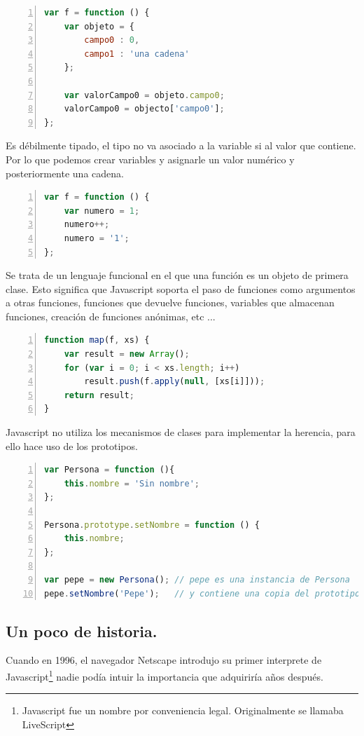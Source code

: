 \begin{lstlisting}[language=JavaScript, numbers=left]
var f = function () {
	var objeto = { 
		campo0 : 0,
		campo1 : 'una cadena' 
	};
	
	var valorCampo0 = objeto.campo0;
	valorCampo0 = objecto['campo0'];
};
\end{lstlisting}

Es débilmente tipado, el tipo no va asociado a la variable si al valor que contiene. Por lo que podemos crear variables y asignarle un valor numérico y posteriormente una cadena. 

\begin{lstlisting}[language=JavaScript, numbers=left]
var f = function () {
	var numero = 1;
	numero++;
	numero = '1';
};
\end{lstlisting}

Se trata de un lenguaje funcional en el que una función es un objeto de primera clase. Esto significa que Javascript soporta el paso de funciones como argumentos a otras funciones, funciones que devuelve funciones, variables que almacenan funciones, creación de funciones anónimas, etc ...

\begin{lstlisting}[language=JavaScript, numbers=left]
function map(f, xs) {
	var result = new Array();
	for (var i = 0; i < xs.length; i++)
		result.push(f.apply(null, [xs[i]]));
	return result;
}
\end{lstlisting}

Javascript no utiliza los mecanismos de clases para implementar la herencia, para ello hace uso de los prototipos. 

\begin{lstlisting}[language=JavaScript, numbers=left]
var Persona = function (){
	this.nombre = 'Sin nombre';
};

Persona.prototype.setNombre = function () {
	this.nombre;
};

var pepe = new Persona(); // pepe es una instancia de Persona 
pepe.setNombre('Pepe');   // y contiene una copia del prototipo de Persona.
\end{lstlisting}


\subsection{Un poco de historia.}

Cuando en 1996, el navegador Netscape introdujo su primer interprete de
Javascript\footnote{Javascript fue un nombre por conveniencia legal. Originalmente se llamaba
  LiveScript} nadie podía intuir la importancia que adquiriría años después. 

